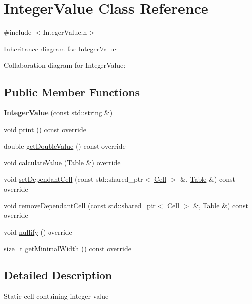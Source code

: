 \hypertarget{classIntegerValue}{}\section{Integer\+Value Class Reference}
\label{classIntegerValue}


{\ttfamily \#include $<$Integer\+Value.\+h$>$}



Inheritance diagram for Integer\+Value\+:


Collaboration diagram for Integer\+Value\+:
\subsection*{Public Member Functions}
\begin{DoxyCompactItemize}
\item 
\mbox{\label{classIntegerValue_a1678b0dfd635f3f0957f74d8a6448340}} 
{\bfseries Integer\+Value} (const std\+::string \&)
\item 
void \hyperlink{classIntegerValue_a3cf6394dee28b404446eff2c6b727634}{print} () const override
\item 
double \hyperlink{classIntegerValue_aafc02b663f92364a94ce69b796301730}{get\+Double\+Value} () const override
\item 
void \hyperlink{classIntegerValue_a00b35d20cf466e13c83feda8d782d0a4}{calculate\+Value} (\hyperlink{classTable}{Table} \&) override
\item 
void \hyperlink{classIntegerValue_a3bd7ab4408d25b74225931d89f62ac8b}{set\+Dependant\+Cell} (const std\+::shared\+\_\+ptr$<$ \hyperlink{classCell}{Cell} $>$ \&, \hyperlink{classTable}{Table} \&) const override
\item 
void \hyperlink{classIntegerValue_a093c194fb370dac25a867980bc4a4eca}{remove\+Dependant\+Cell} (const std\+::shared\+\_\+ptr$<$ \hyperlink{classCell}{Cell} $>$ \&, \hyperlink{classTable}{Table} \&) const override
\item 
void \hyperlink{classIntegerValue_a6232180f3447a08a204612dfa9543631}{nullify} () override
\item 
size\+\_\+t \hyperlink{classIntegerValue_ac16c4b202cc48d96e9b1aa0137be7239}{get\+Minimal\+Width} () const override
\end{DoxyCompactItemize}


\subsection{Detailed Description}
Static cell containing integer value 

